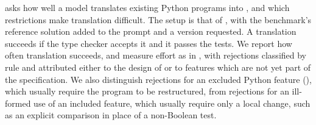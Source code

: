  asks how well a model translates existing Python programs into \PurePy, and which
restrictions make translation difficult. The setup is that of , with the benchmark's reference
solution added to the prompt and a \PurePy version requested. A translation succeeds if the type checker accepts
it and it passes the tests. We report how often translation succeeds, and measure effort as in ,
with rejections classified by rule and attributed either to the design of \PurePy or to features which are not
yet part of the specification. We also distinguish rejections for an excluded Python feature
(), which usually require the program to be restructured, from rejections for an
ill-formed use of an included feature, which usually require only a local change, such as an explicit comparison in
place of a non-Boolean test.
